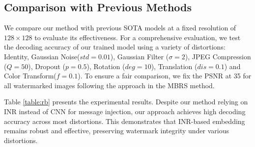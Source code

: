 \documentclass{article}
\begin{document}
\subsection{Comparison with Previous Methods}
We compare our method with previous SOTA models at a fixed resolution of $128\times 128$ to evaluate its effectiveness. For a comprehensive evaluation, we test the decoding accuracy of our trained model using a variety of distortions: Identity, Gaussian Noise($std=0.01$), Gaussian Filter ($\sigma=2$), JPEG Compression ($Q=50$), Dropout ($p=0.5$), Rotation ($deg=10$), Translation ($dis=0.1$) and Color Transform($f=0.1$).  To ensure a fair comparison, we fix the PSNR at 35 for all watermarked images following the approach in the MBRS \cite{jia2021mbrs} method. 

Table \ref{table:rb} presents the experimental results.
Despite our method relying on INR instead of CNN for message injection, our approach achieves high decoding accuracy across most distortions. This demonstrates that INR-based embedding remains robust and effective, preserving watermark integrity under various distortions.
\end{document}
